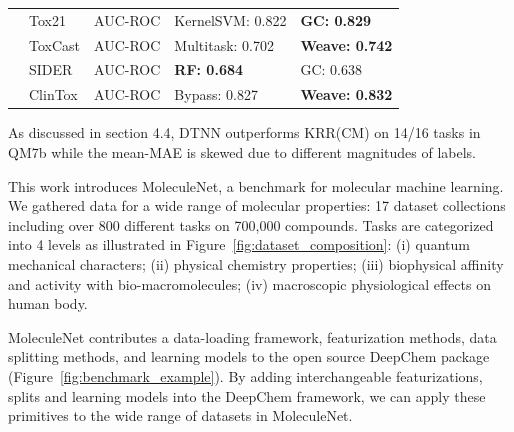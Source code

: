 \begin{table}[htbp]
\begin{threeparttable}[b]
\begin{tabular*}{\textwidth}{@{\extracolsep{\fill}}lllll}
    & Tox21 & AUC-ROC & KernelSVM: 0.822 & \textbf{GC: 0.829} \\\cline{2-5}
    & ToxCast & AUC-ROC & Multitask: 0.702 & \textbf{Weave: 0.742} \\\cline{2-5}
    & SIDER & AUC-ROC & \textbf{RF: 0.684} & GC: 0.638 \\\cline{2-5}
    & ClinTox & AUC-ROC& Bypass: 0.827 & \textbf{Weave: 0.832} \\
    \hline
    \end{tabular*}    
    \begin{tablenotes}
        \item * As discussed in section 4.4, DTNN outperforms KRR(CM) on 14/16 tasks in QM7b while the mean-MAE is skewed due to different magnitudes of labels.
    \end{tablenotes}
    \end{threeparttable}
\end{table}

This work introduces MoleculeNet, a benchmark for molecular machine learning. We gathered data for a wide range of molecular properties: 17 dataset collections including over 800 different tasks on 700,000 compounds. Tasks are categorized into 4 levels as illustrated in Figure~\ref{fig:dataset_composition}: (i) quantum mechanical characters; (ii) physical chemistry properties; (iii) biophysical affinity and activity with bio-macromolecules; (iv) macroscopic physiological effects on human body. 

MoleculeNet contributes a data-loading framework, featurization methods, data splitting methods, and learning models to the open source DeepChem package (Figure~\ref{fig:benchmark_example}). By adding interchangeable featurizations, splits and learning models into the DeepChem framework, we can apply these primitives to the wide range of datasets in MoleculeNet. 

